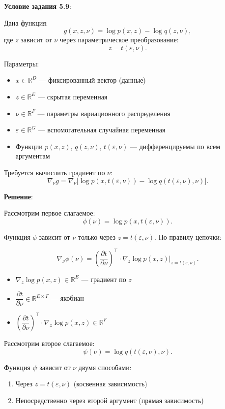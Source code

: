 \documentclass[pract]{SCWorks}
\begin{document}
    \textbf{Условие задания 5.9}:

    Дана функция:
    \[
    g(x, z, \nu) = \log p(x, z) - \log q(z, \nu),
    \]
    где $z$ зависит от $\nu$ через параметрическое преобразование:
    \[
    z = t(\varepsilon, \nu).
    \]

    Параметры:
    \begin{itemize}
        \item[$\bullet$] $x \in \mathbb{R}^D$ — фиксированный вектор (данные)
        \item[$\bullet$] $z \in \mathbb{R}^E$ — скрытая переменная
        \item[$\bullet$] $\nu \in \mathbb{R}^F$ — параметры вариационного распределения
        \item[$\bullet$] $\varepsilon \in \mathbb{R}^G$ — вспомогательная случайная переменная
        \item[$\bullet$] Функции $p(x, z)$, $q(z, \nu)$, $t(\varepsilon, \nu)$ — дифференцируемы по всем аргументам
    \end{itemize}

    Требуется вычислить градиент по $\nu$:
    \[
    \nabla_\nu g = \nabla_\nu \bigl[ \log p(x, t(\varepsilon, \nu)) - \log q(t(\varepsilon, \nu), \nu) \bigr].
    \]

    \textbf{Решение}:

    Рассмотрим первое слагаемое:
    \[
    \phi(\nu) = \log p(x, t(\varepsilon, \nu)).
    \]

    Функция $\phi$ зависит от $\nu$ только через $z = t(\varepsilon, \nu)$. По правилу цепочки:

    \[
    \nabla_\nu \phi(\nu) = \left( \frac{\partial t}{\partial \nu} \right)^\top \cdot \nabla_z \log p(x, z) \big|_{z = t(\varepsilon, \nu)}.
    \]

    \begin{itemize}
        \item[$\bullet$] $\nabla_z \log p(x, z) \in \mathbb{R}^E$ — градиент по $z$
        \item[$\bullet$] $\dfrac{\partial t}{\partial \nu} \in \mathbb{R}^{E \times F}$ — якобиан
        \item[$\bullet$] $\left(\dfrac{\partial t}{\partial \nu}\right)^\top \cdot \nabla_z \log p(x, z) \in \mathbb{R}^F$
    \end{itemize}

    Рассмотрим второе слагаемое:
    \[
    \psi(\nu) = \log q(t(\varepsilon, \nu), \nu).
    \]

    Функция $\psi$ зависит от $\nu$ двумя способами:
    \begin{enumerate}
        \item[$\bullet$] Через $z = t(\varepsilon, \nu)$ (косвенная зависимость)
        \item[$\bullet$] Непосредственно через второй аргумент (прямая зависимость)
    \end{enumerate}
\end{document}
